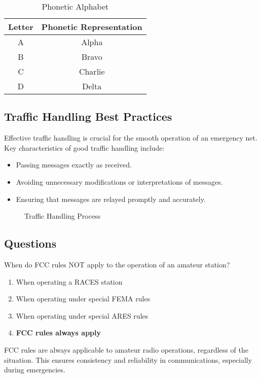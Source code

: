 \begin{table}[h]
    \centering
    \caption{Phonetic Alphabet}
    \label{tab:phonetic_alphabet}
    \begin{tabular}{|c|c|}
        \hline
        \textbf{Letter} & \textbf{Phonetic Representation} \\
        \hline
        A & Alpha \\
        B & Bravo \\
        C & Charlie \\
        D & Delta \\
        \hline
    \end{tabular}
\end{table}

\subsection*{Traffic Handling Best Practices}
Effective traffic handling is crucial for the smooth operation of an emergency net. Key characteristics of good traffic handling include:
\begin{itemize}
    \item Passing messages exactly as received.
    \item Avoiding unnecessary modifications or interpretations of messages.
    \item Ensuring that messages are relayed promptly and accurately.
\end{itemize}

\begin{figure}[h]
    \centering
    \caption{Traffic Handling Process}
    \label{fig:traffic_handling}
\end{figure}

\subsection*{Questions}
\begin{tcolorbox}[colback=gray!10!white,colframe=black!75!black,title={T2C01}]
    When do FCC rules NOT apply to the operation of an amateur station?
    \begin{enumerate}[label=\Alph*,noitemsep]
        \item When operating a RACES station
        \item When operating under special FEMA rules
        \item When operating under special ARES rules
        \item \textbf{FCC rules always apply}
    \end{enumerate}
\end{tcolorbox}
FCC rules are always applicable to amateur radio operations, regardless of the situation. This ensures consistency and reliability in communications, especially during emergencies.

